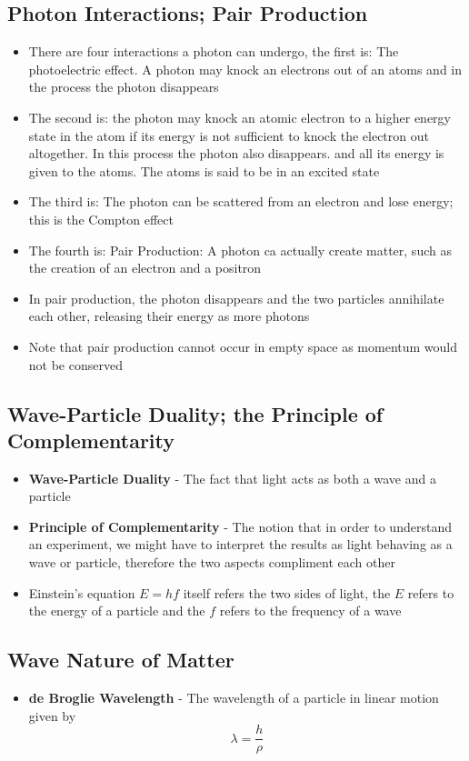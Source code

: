 \subsection{Photon Interactions; Pair Production}
\begin{itemize}
    \item There are four interactions a photon can undergo, the first is: The photoelectric effect. A photon may knock an electrons out of an atoms and in the process the photon disappears
    \item The second is: the photon may knock an atomic electron to a higher energy state in the atom if its energy is not sufficient to knock the electron out altogether. In this process the photon also disappears. and all its energy is given to the atoms. The atoms is said to be in an excited state
    \item The third is: The photon can be scattered from an electron and lose energy; this is the Compton effect
    \item The fourth is: Pair Production: A photon ca actually create matter, such as the creation of an electron and a positron 
    \item In pair production, the photon disappears and the two particles annihilate each other, releasing their energy as more photons
    \item Note that pair production cannot occur in empty space as momentum would not be conserved
\end{itemize}

\subsection{Wave-Particle Duality; the Principle of Complementarity}
\begin{itemize}
    \item \textbf{Wave-Particle Duality} - The fact that light acts as both a wave and a particle
    \item \textbf{Principle of Complementarity} - The notion that in order to understand an experiment, we might have to interpret the results as light behaving as a wave or particle, therefore the two aspects compliment each other
    \item Einstein's equation \(E=hf\) itself refers the two sides of light, the \(E\) refers to the energy of a particle and the \(f\) refers to the frequency of a wave
\end{itemize}

\subsection{Wave Nature of Matter}
\begin{itemize}
    \item \textbf{de Broglie Wavelength} - The wavelength of a particle in linear motion given by \[\lambda=\frac{h}{\rho}\]
\end{itemize}

